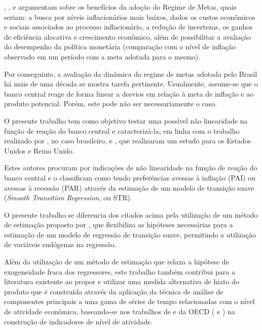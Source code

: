 \documentclass[
	article,			%
	11pt,				%
	oneside,			%
	a4paper,			%
	english,			%
	brazil,				%
	]{abntex2}
\begin{document}
	, ,  e  argumentam sobre os benefícios da adoção do Regime de Metas, quais seriam: a busca por níveis inflacionários mais baixos, dados os custos econômicos e sociais associados ao processo inflacionário, a redução de incertezas, os ganhos de eficiência alocativa e crescimento econômico, além de possibilitar a avaliação do desempenho da política monetária (comparação com o nível de inflação observado em um período com a meta adotada para o mesmo).
	
	Por conseguinte, a avaliação da dinâmica do regime de metas adotada pelo Brasil há mais de uma década se mostra tarefa pertinente. Usualmente, assume-se que o banco central reage de forma linear a desvios em relação à meta de inflação e ao produto potencial.  Porém, este pode não ser necessariamente o caso.
	
	O presente trabalho tem como objetivo testar uma possível não linearidade na função de reação do banco central e catacterizá-la, em linha com o trabalho realizado por , no caso brasileiro, e , que realizaram um estudo para os Estados Unidos e Reino Unido. 
	
	Estes autores procuram por indicações de não linearidade na função de reação do banco central e o classificam como tendo preferências avessas à inflação (PAI) ou avessas à recessão (PAR) através da estimação de um modelo de transição suave (\textit{Smooth Transition Regression}, ou STR).
	
	O presente trabalho se diferencia dos citados acima pela utilização de um método de estimação proposto por , que flexibiliza as hipóteses necessárias para a estimação de um modelo de regressão de transição suave, permitindo a utilização de variáveis endógenas na regressão. 
	
	Além da utilização de um método de estimação que relaxa a hipótese de exogeneidade fraca dos regressores, este trabalho também contribui para a literatura existente ao propor e utilizar uma medida alternativa de hiato do produto que é construída através da aplicação da técnica de análise de componentes principais a uma gama de séries de tempo relacionadas com o nível de atividade econômica, baseando-se nos trabalhos de  e da OECD ( e ) na construção de indicadores de nível de atividade.
	
\end{document}
